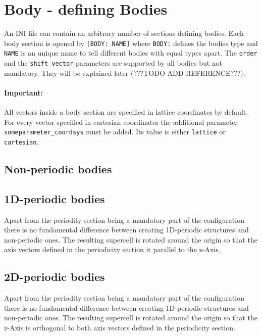 \section{Body - defining Bodies}

An INI file can contain an arbitrary number of sections defining bodies. Each body section is opened by \lstinline{[BODY: NAME]} where \lstinline{BODY:} defines the bodies type and \lstinline{NAME} is an unique name to tell different bodies with equal types apart. The \lstinline{order} and the \lstinline{shift_vector} parameters are supported by all bodies but not mandatory. They will be explained later (???TODO ADD REFERENCE???).

\paragraph{Important:} All vectors inside a body section are specified in lattice coordinates by default. For every vector specified in cartesian coordinates the additional parameter \lstinline{someparameter_coordsys} must be added. Its value is either \lstinline{lattice} or \lstinline{cartesian}.

\subsection{Non-periodic bodies}



\subsection{1D-periodic bodies}
Apart from the periodity section being a mandatory part of the configuration there is no fundamental difference between creating 1D-periodic structures and non-periodic ones. The resulting supercell is rotated around the origin so that the axis vectors defined in the periodicity section it parallel to the z-Axis.




\subsection{2D-periodic bodies}

Apart from the periodity section being a mandatory part of the configuration there is no fundamental difference between creating 1D-periodic structures and non-periodic ones. The resulting supercell is rotated around the origin so that the z-Axis is orthogonal to both axis vectors defined in the periodicity section.


